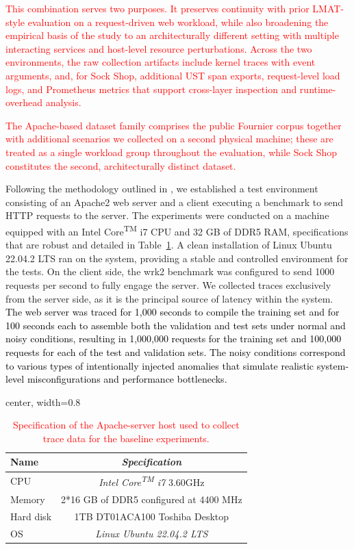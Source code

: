 \documentclass[preprint,12pt]{elsarticle}
\begin{document}
\textcolor{red}{This combination serves two purposes. It preserves continuity with prior LMAT-style evaluation on a request-driven web workload, while also broadening the empirical basis of the study to an architecturally different setting with multiple interacting services and host-level resource perturbations. Across the two environments, the raw collection artifacts include kernel traces with event arguments, and, for Sock Shop, additional UST span exports, request-level load logs, and Prometheus metrics that support cross-layer inspection and runtime-overhead analysis.}

\textcolor{red}{The Apache-based dataset family comprises the public Fournier corpus together with additional scenarios we collected on a second physical machine; these are treated as a single workload group throughout the evaluation, while Sock Shop constitutes the second, architecturally distinct dataset.}

Following the methodology outlined in \cite{fournier2023language}, we established a test environment consisting of an Apache2 web server and a client executing a benchmark to send HTTP requests to the server. The experiments were conducted on a machine equipped with an Intel\textregistered{} Core\textsuperscript{TM} i7 CPU and 32 GB of DDR5 RAM, specifications that are robust and detailed in Table~\ref{tbl:systemconfiguration}. A clean installation of Linux Ubuntu 22.04.2 LTS ran on the system, providing a stable and controlled environment for the tests. On the client side, the wrk2 benchmark was configured to send 1000 requests per second to fully engage the server. We collected traces exclusively from the server side, as it is the principal source of latency within the system. \textcolor{black}{The web server was traced for 1,000 seconds to compile the training set and for 100 seconds each to assemble both the validation and test sets under normal and noisy conditions, resulting in 1,000,000 requests for the training set and 100,000 requests for each of the test and validation sets. The noisy conditions correspond to various types of intentionally injected anomalies that simulate realistic system-level misconfigurations and performance bottlenecks.}

\begin{table}[tb]
\caption{\textcolor{red}{Specification of the Apache-server host used to collect trace data for the baseline experiments.}}
\centering
\begin{adjustbox}{center, width=0.8\textwidth}
\begin{tabular}{lc}
\hline \hline
Name & \textit{Specification} \\\hline
CPU & \textit{Intel\textregistered{} Core\textsuperscript{TM} i7} 3.60GHz\\
Memory & 2*16 GB of DDR5 configured at 4400 MHz \\
Hard disk & 1TB DT01ACA100 Toshiba Desktop\\
OS & \textit{Linux Ubuntu 22.04.2 LTS}\\
\hline \hline
\end{tabular}
\end{adjustbox}
\label{tbl:systemconfiguration}
\end{table}
\end{document}
